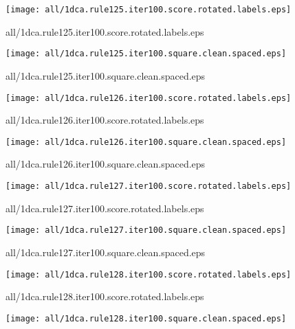 \documentclass{article}
\begin{document}
\begin{center}
\begin{minipage}{\textwidth}
\texttt{[image: all/1dca.rule125.iter100.score.rotated.labels.eps]}
\end{minipage}
\end{center}
{\footnotesize all/1dca.rule125.iter100.score.rotated.labels.eps}
\begin{center}
\begin{minipage}{\textwidth}
\texttt{[image: all/1dca.rule125.iter100.square.clean.spaced.eps]}
\end{minipage}
\end{center}
{\footnotesize all/1dca.rule125.iter100.square.clean.spaced.eps}
\begin{center}
\begin{minipage}{\textwidth}
\texttt{[image: all/1dca.rule126.iter100.score.rotated.labels.eps]}
\end{minipage}
\end{center}
{\footnotesize all/1dca.rule126.iter100.score.rotated.labels.eps}
\begin{center}
\begin{minipage}{\textwidth}
\texttt{[image: all/1dca.rule126.iter100.square.clean.spaced.eps]}
\end{minipage}
\end{center}
{\footnotesize all/1dca.rule126.iter100.square.clean.spaced.eps}
\begin{center}
\begin{minipage}{\textwidth}
\texttt{[image: all/1dca.rule127.iter100.score.rotated.labels.eps]}
\end{minipage}
\end{center}
{\footnotesize all/1dca.rule127.iter100.score.rotated.labels.eps}
\begin{center}
\begin{minipage}{\textwidth}
\texttt{[image: all/1dca.rule127.iter100.square.clean.spaced.eps]}
\end{minipage}
\end{center}
{\footnotesize all/1dca.rule127.iter100.square.clean.spaced.eps}
\begin{center}
\begin{minipage}{\textwidth}
\texttt{[image: all/1dca.rule128.iter100.score.rotated.labels.eps]}
\end{minipage}
\end{center}
{\footnotesize all/1dca.rule128.iter100.score.rotated.labels.eps}
\begin{center}
\begin{minipage}{\textwidth}
\texttt{[image: all/1dca.rule128.iter100.square.clean.spaced.eps]}
\end{minipage}
\end{center}
\end{document}
